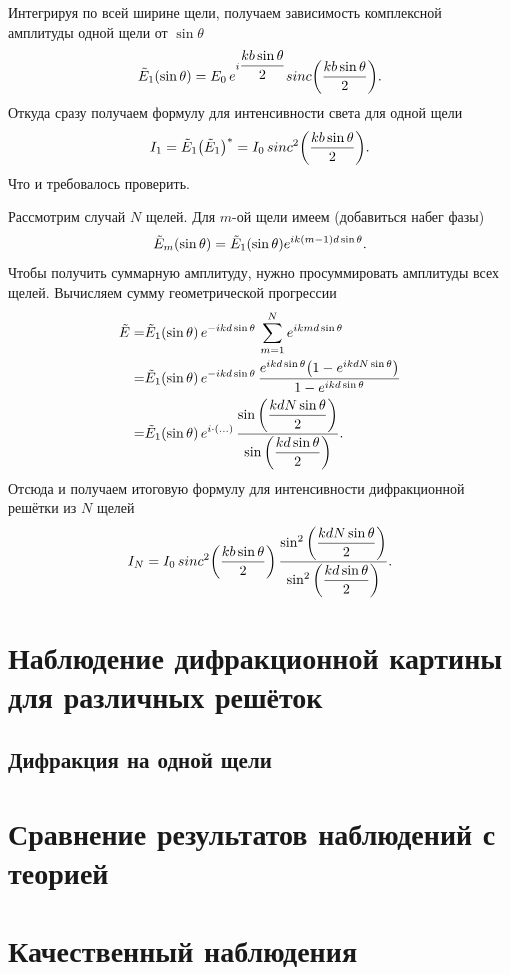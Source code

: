 \documentclass[12pt]{article}
\begin{document}
	Интегрируя по всей ширине щели, получаем зависимость комплексной амплитуды одной щели от $\sin{\theta}$
	\begin{equation}
		\tilde{E}_1\qty(\sin{\theta}) = E_0\, e^{i\dfrac{kb\sin{\theta}}{2}} sinc\qty(\dfrac{kb\sin{\theta}}{2}).
	\end{equation}
	Откуда сразу получаем формулу для интенсивности света для одной щели
	\begin{equation}
		I_1 = \tilde{E}_1 \qty(\tilde{E}_1)^* = I_0\, sinc^2\qty(\dfrac{kb\sin{\theta}}{2}).
	\end{equation}
	Что и требовалось проверить. 
	\par Рассмотрим случай $N$ щелей. Для $m$\--ой щели имеем (добавиться набег фазы)
	\begin{equation}
		\tilde{E}_m\qty(\sin{\theta}) = \tilde{E}_1\qty(\sin{\theta}) e^{ik(m-1)d\sin{\theta}}.
	\end{equation}
	Чтобы получить суммарную амплитуду, нужно просуммировать амплитуды всех щелей. Вычисляем сумму геометрической прогрессии
	\begin{equation}
	\begin{split}
		\tilde{E} =& \tilde{E}_1\qty(\sin{\theta})\, e^{-ikd\sin{\theta}}\, \sum_{m=1}^{N} e^{ikmd\sin{\theta}}\\
		=&\tilde{E}_1\qty(\sin{\theta})\, e^{-ikd\sin{\theta}}\, \dfrac{e^{ikd\sin{\theta}}\qty(1 - e^{ikdN\sin{\theta}})}{1-e^{ikd\sin{\theta}}}\\
		=&\tilde{E}_1\qty(\sin{\theta})\, e^{i\cdot (...)}\, \dfrac{\sin\qty(\dfrac{kdN\sin{\theta}}{2})}{\sin\qty(\dfrac{kd\sin{\theta}}{2})}.
	\end{split}
	\end{equation}
	Отсюда и получаем итоговую формулу для интенсивности дифракционной решётки из $N$ щелей
	\begin{equation}
		I_N =  I_0\, sinc^2\qty(\dfrac{kb\sin{\theta}}{2})\, \dfrac{\sin^2\qty(\dfrac{kdN\sin{\theta}}{2})}{\sin^2\qty(\dfrac{kd\sin{\theta}}{2})}.
	\end{equation}

	\section{Наблюдение дифракционной картины для различных решёток}
	\subsection{Дифракция на одной щели}


	\section{Сравнение результатов наблюдений с теорией}

	\section{Качественный наблюдения}
\end{document}
